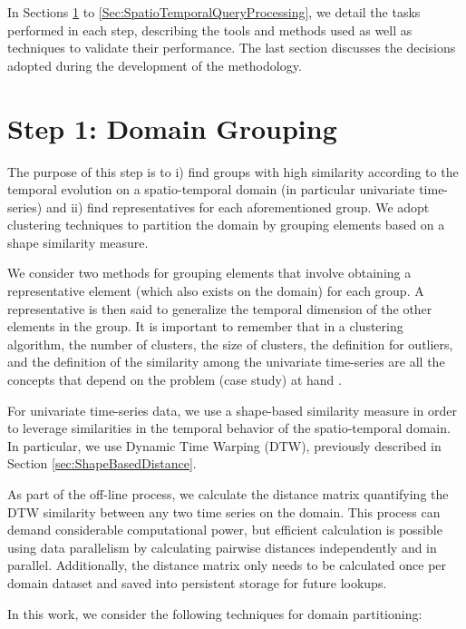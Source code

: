 In Sections \ref{Sec:DomainPartitioning} to \ref{Sec:SpatioTemporalQueryProcessing}, we detail the tasks performed in each step, describing the tools and methods used as well as techniques to validate their performance. The last section discusses the decisions adopted during the development of the methodology.

\section{Step 1: Domain Grouping}
\label{Sec:DomainPartitioning}

The purpose of this step is to i) find groups with high similarity according to the temporal evolution on a spatio-temporal domain (in particular univariate time-series) and ii) find representatives for each aforementioned group. We adopt clustering techniques to partition the domain by grouping elements based on a shape similarity measure. 

We consider two methods for grouping elements that involve obtaining a representative element (which also exists on the domain) for each group. A representative is then said to generalize the temporal dimension of the other elements in the group. It is important to remember that in a clustering algorithm, the number of clusters, the size of clusters, the definition for outliers, and the definition of the similarity among the univariate time-series are all the concepts that depend on the problem (case study) at hand \cite{Aghabozorgi2015}.

For univariate time-series data, we use a shape-based similarity measure in order to leverage similarities in the temporal behavior of the spatio-temporal domain. In particular, we use Dynamic Time Warping (DTW), previously described in Section \ref{sec:ShapeBasedDistance}.

As part of the off-line process, we calculate the distance matrix quantifying the DTW similarity between any two time series on the domain. This process can demand considerable computational power, but efficient calculation is possible using data parallelism by calculating pairwise distances independently and in parallel. Additionally, the distance matrix only needs to be calculated once per domain dataset and saved into persistent storage for future lookups.

In this work, we consider the following techniques for domain partitioning:

